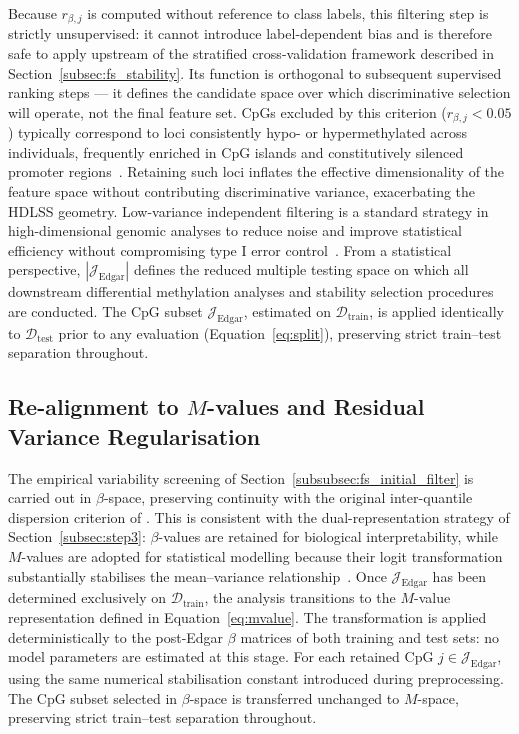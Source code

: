 Because $r_{\beta,j}$ is computed without reference to class 
labels, this filtering step is strictly unsupervised: it 
cannot introduce label-dependent bias and is therefore safe 
to apply upstream of the stratified cross-validation 
framework described in Section~\ref{subsec:fs_stability}. 
Its function is orthogonal to subsequent supervised ranking 
steps — it defines the candidate space over which 
discriminative selection will operate, not the final 
feature set.
CpGs excluded by this criterion ($r_{\beta,j} < 0.05$) 
typically correspond to loci consistently hypo- or 
hypermethylated across individuals, frequently enriched 
in CpG islands and constitutively silenced promoter 
regions~\cite{Edgar2017, Bock2012}. Retaining such loci 
inflates the effective dimensionality of the feature space 
without contributing discriminative variance, exacerbating 
the HDLSS geometry. Low-variance independent filtering is a standard strategy in high-dimensional genomic analyses to reduce noise and improve statistical efficiency without compromising type I error control~\cite{Bourgon2010}.
From a statistical perspective, $|\mathcal{J}_{\mathrm{Edgar}}|$ 
defines the reduced multiple testing space on which all 
downstream differential methylation analyses and stability 
selection procedures are conducted. The CpG subset 
$\mathcal{J}_{\mathrm{Edgar}}$, estimated on 
$\mathcal{D}_{\mathrm{train}}$, is applied identically to 
$\mathcal{D}_{\mathrm{test}}$ prior to any evaluation 
(Equation~\ref{eq:split}), preserving strict 
train--test separation throughout.

\subsection{Re-alignment to $M$-values and Residual Variance Regularisation}
\label{subsec:fs_m_realign}

The empirical variability screening of Section~\ref{subsubsec:fs_initial_filter}
is carried out in $\beta$-space, preserving continuity with the original
inter-quantile dispersion criterion of \cite{Edgar2017}. This is consistent with
the dual-representation strategy of Section~\ref{subsec:step3}: $\beta$-values
are retained for biological interpretability, while $M$-values are adopted for
statistical modelling because their logit transformation substantially stabilises
the mean--variance relationship~\cite{Du2010}.
Once $\mathcal{J}_{\mathrm{Edgar}}$ has been determined exclusively on
$\mathcal{D}_{\mathrm{train}}$, the analysis transitions to the $M$-value
representation defined in Equation~\eqref{eq:mvalue}. The transformation is
applied deterministically to the post-Edgar $\beta$ matrices of both training
and test sets: no model parameters are estimated at this stage. For each retained
CpG $j \in \mathcal{J}_{\mathrm{Edgar}}$,
using the same numerical stabilisation constant introduced during preprocessing.
The CpG subset selected in $\beta$-space is transferred unchanged to $M$-space,
preserving strict train--test separation throughout.

